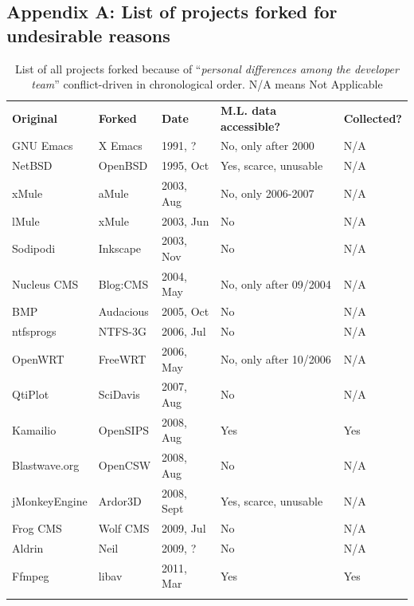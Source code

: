 \documentclass[12pt]{report}
\begin{document}
\begin{appendices}

\section{Appendix A: List of projects forked for undesirable reasons}
\label{tablesOfListsOfAllProjects}


\begin{table} [H]
\centering
\caption[List of all projects forked because of ``\textit{personal differences among the developer team}'' conflict-driven]{List of all projects forked because of ``\textit{personal differences among the developer team}'' conflict-driven \cite{Robles} in chronological order. N/A means Not Applicable}
\label{tabelProjectsForkedCat1PersonalDiffereces}       
\begin{tabular}{m{} m{} m{} m{} m{}}
\hline\noalign{\smallskip}
\textbf{Original} & \textbf{Forked} & \textbf{Date} & \textbf{M.L. data accessible?} & \textbf{Collected?}\\
\noalign{\smallskip}\hline\noalign{\smallskip}
GNU Emacs & X Emacs & 1991, ? & No, only after 2000 & N/A \\ \hline
NetBSD & OpenBSD & 1995, Oct & Yes, scarce, unusable & N/A \\ \hline
xMule & aMule & 2003, Aug & No, only 2006-2007 & N/A \\ \hline
lMule & xMule & 2003, Jun & No & N/A \\ \hline
Sodipodi & Inkscape & 2003, Nov & No & N/A\\ \hline
Nucleus CMS & Blog:CMS & 2004, May & No, only after 09/2004 & N/A \\ \hline
BMP & Audacious & 2005, Oct & No & N/A \\ \hline
ntfsprogs & NTFS-3G & 2006, Jul & No & N/A \\ \hline
OpenWRT & FreeWRT & 2006, May & No, only after 10/2006 & N/A \\ \hline
QtiPlot & SciDavis & 2007, Aug & No & N/A \\ \hline
Kamailio & OpenSIPS & 2008, Aug & Yes & Yes \\ \hline
Blastwave.org & OpenCSW & 2008, Aug & No & N/A \\ \hline
jMonkeyEngine & Ardor3D & 2008, Sept & Yes, scarce, unusable & N/A \\ \hline
Frog CMS & Wolf CMS & 2009, Jul & No & N/A \\ \hline
Aldrin & Neil & 2009, ? & No & N/A \\ \hline
Ffmpeg & libav & 2011, Mar & Yes & Yes\\
\noalign{\smallskip}\hline
\end{tabular}
\end{table}


\end{appendices}
\end{document}
